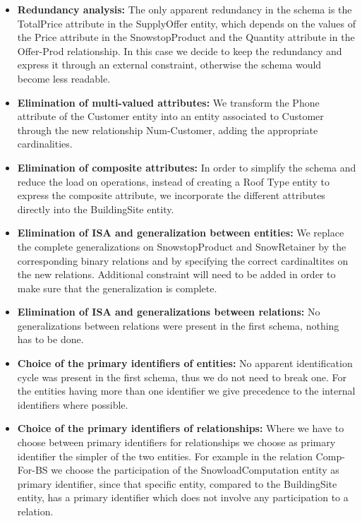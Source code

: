\begin{itemize}
  \item \textbf{Redundancy analysis:}
  The only apparent redundancy in the schema is the TotalPrice attribute in the SupplyOffer entity, which depends on the values of the Price attribute in the SnowstopProduct and the Quantity attribute in the Offer-Prod relationship. In this case we decide to keep the redundancy and express it through an external constraint, otherwise the schema would become less readable.
  \item \textbf{Elimination of multi-valued attributes:}
  We transform the Phone attribute of the Customer entity into an entity associated to Customer through the new relationship Num-Customer, adding the appropriate cardinalities.
  \item \textbf{Elimination of composite attributes:}
  In order to simplify the schema and reduce the load on operations, instead of creating a Roof Type entity to express the composite attribute, we incorporate the different attributes directly into the BuildingSite entity.
  \item \textbf{Elimination of ISA and generalization between entities:}
  We replace the complete generalizations on SnowstopProduct and SnowRetainer by the corresponding binary relations and by specifying the correct cardinaltites on the new relations. Additional constraint will need to be added in order to make sure that the generalization is complete.
  \item \textbf{Elimination of ISA and generalizations between relations:}
  No generalizations between relations were present in the first schema, nothing has to be done.
  \item \textbf{Choice of the primary identifiers of entities:}
  No apparent identification cycle was present in the first schema, thus we do not need to break one. For the entities having more than one identifier we give precedence to the internal identifiers where possible.
  \item \textbf{Choice of the primary identifiers of relationships:}
  Where we have to choose between primary identifiers for relationships we choose as primary identifier the simpler of the two entities. For example in the relation Comp-For-BS we choose the participation of the SnowloadComputation entity as primary identifier, since that specific entity, compared to the BuildingSite entity, has a primary identifier which does not involve any participation to a relation.
\end{itemize}

